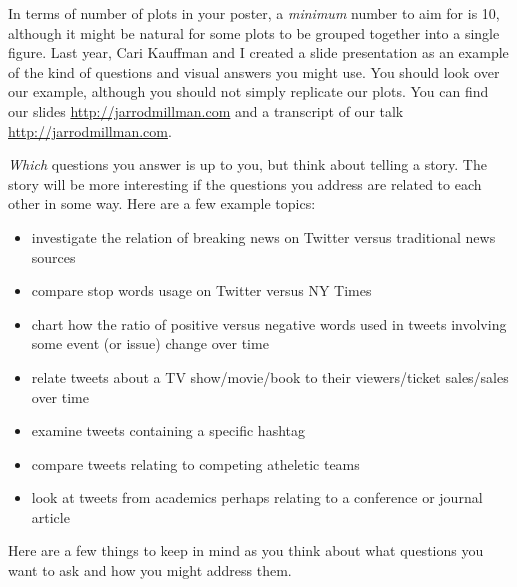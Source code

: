 \documentclass[11pt, oneside]{article}   	%
\begin{document}
In terms of number of plots in your poster, a {\em minimum} number to aim for
is 10, although it might be natural for some plots to be grouped together into
a single figure. Last year, Cari Kauffman and I created a slide presentation as
an example of the kind of questions and visual answers you might use.  You
should look over our example, although you should not simply replicate our
plots.  You can find our slides \href{here}{http://jarrodmillman.com} and
a transcript of our talk \href{here}{http://jarrodmillman.com}.

{\em Which} questions you answer is up to you, but think about telling a story.
The story will be more interesting if the questions you address are related to
each other in some way.  Here are a few example topics:

\begin{itemize}
\item investigate the relation of breaking news on Twitter versus traditional
      news sources
\item compare stop words usage on Twitter versus NY Times
\item chart how the ratio of positive versus negative words used in tweets
      involving some event (or issue) change over time
\item relate tweets about a TV show/movie/book to their viewers/ticket
      sales/sales over time
\item examine tweets containing a specific hashtag
\item compare tweets relating to competing atheletic teams
\item look at tweets from academics perhaps relating to a conference
      or journal article
\end{itemize}

Here are a few things to keep in mind as you think about what questions you
want to ask and how you might address them.
\end{document}
